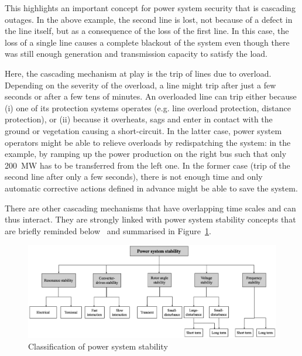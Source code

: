 This highlights an important concept for power system security that is cascading outages. In the above example, the second line is lost, not because of a defect in the line itself, but as a consequence of the loss of the first line. In this case, the loss of a single line causes a complete blackout of the system even though there was still enough generation and transmission capacity to satisfy the load.

Here, the cascading mechanism at play is the trip of lines due to overload. Depending on the severity of the overload, a line might trip after just a few seconds or after a few tens of minutes. An overloaded line can trip either because (i) one of its protection systems operates (e.g. line overload protection, distance protection), or (ii) because it overheats, sags and enter in contact with the ground or vegetation causing a short-circuit. In the latter case, power system operators might be able to relieve overloads by redispatching the system: in the example, by ramping up the power production on the right bus such that only 200~MW has to be transferred from the left one. In the former case (trip of the second line after only a few seconds), there is not enough time and only automatic corrective actions defined in advance might be able to save the system.

There are other cascading mechanisms that have overlapping time scales and can thus interact. They are strongly linked with power system stability concepts that are briefly reminded below~\cite{StabilityDefinition, StabilityDefinitionRevised} and summarised in Figure~\ref{fig:stability_classification}.

\begin{figure}
    \centering
    \includegraphics[width=\linewidth]{Figs/StabilityClassification.png}
    \caption{Classification of power system stability~\cite{StabilityDefinitionRevised}}
    \label{fig:stability_classification}
\end{figure}

